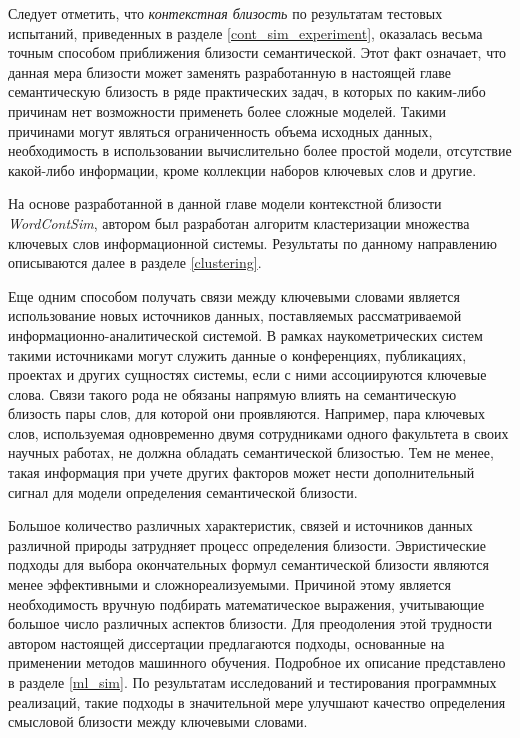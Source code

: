 Следует отметить, что \emph{контекстная близость} по результатам тестовых испытаний, приведенных в разделе \ref{cont_sim_experiment}, оказалась весьма точным способом приближения близости семантической. Этот факт означает, что данная мера близости может заменять разработанную в настоящей главе семантическую близость в ряде практических задач, в которых по каким-либо причинам нет возможности применеть более сложные моделей. Такими причинами могут являться ограниченность объема исходных данных, необходимость в использовании вычислительно более простой модели, отсутствие какой-либо информации, кроме коллекции наборов ключевых слов и другие.

На основе разработанной в данной главе модели контекстной близости \emph{WordContSim}, автором был разработан алгоритм кластеризации множества ключевых слов информационной системы. Результаты по данному направлению описываются далее в разделе \ref{clustering}.

Еще одним способом получать связи между ключевыми словами является использование новых источников данных, поставляемых рассматриваемой информационно-аналитической системой. В рамках наукометрических систем такими источниками могут служить данные о конференциях, публикациях, проектах и других сущностях системы, если с ними ассоциируются ключевые слова. Связи такого рода не обязаны напрямую влиять на семантическую близость пары слов, для которой они проявляются. Например, пара ключевых слов, используемая одновременно двумя сотрудниками одного факультета в своих научных работах, не должна обладать семантической близостью. Тем не менее, такая информация при учете других факторов может нести дополнительный сигнал для модели определения семантической близости.

Большое количество различных характеристик, связей и источников данных различной природы затрудняет процесс определения близости. Эвристические подходы для выбора окончательных формул семантической близости являются менее эффективными и сложнореализуемыми. Причиной этому является необходимость вручную подбирать математическое выражения, учитывающие большое число различных аспектов близости. Для преодоления этой трудности автором настоящей диссертации предлагаются подходы, основанные на применении методов машинного обучения. Подробное их описание представлено в разделе \ref{ml_sim}. По результатам исследований и тестирования программных реализаций, такие подходы в значительной мере улучшают качество определения смысловой близости между ключевыми словами. 

